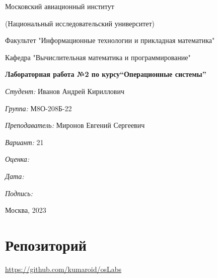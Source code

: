 \documentclass[a4paper, 12pt]{article}
\begin{document}
\thispagestyle{empty}	
\begin{center}
	Московский авиационный институт
	
	(Национальный исследовательский университет)
	
	Факультет "Информационные технологии и прикладная математика"
	
	Кафедра "Вычислительная математика и программирование"
	
\end{center}
\vspace{40ex}
\begin{center}
	\textbf{\large{Лабораторная работа №2 по курсу\linebreak \textquotedblleft Операционные системы\textquotedblright}}
\end{center}
\vspace{35ex}
\begin{flushright}
	\textit{Студент: } Иванов Андрей Кириллович
	
	\vspace{2ex}
	\textit{Группа: } М8О-208Б-22
	
	\vspace{2ex}
	\textit{Преподаватель: } Миронов Евгений Сергеевич
	
	\vspace{2ex}
	\textit{Вариант: } 21
	
	\vspace{2ex}
	\textit{Оценка: } \underline{\quad\quad\quad\quad\quad\quad}
	
	 \vspace{2ex}
	\textit{Дата: } \underline{\quad\quad\quad\quad\quad\quad}
	
	\vspace{2ex}
	\textit{Подпись: } \underline{\quad\quad\quad\quad\quad\quad}
	
\end{flushright}

\vspace{5ex}

\begin{vfill}
	\begin{center}
		Москва, 2023
	\end{center}	
\end{vfill}
\newpage


\begingroup
\color{black}
\tableofcontents\newpage
\endgroup

\section{Репозиторий}
\href{https://github.com/kumaroid/osLabs}{https://github.com/kumaroid/osLabs}
\end{document}
